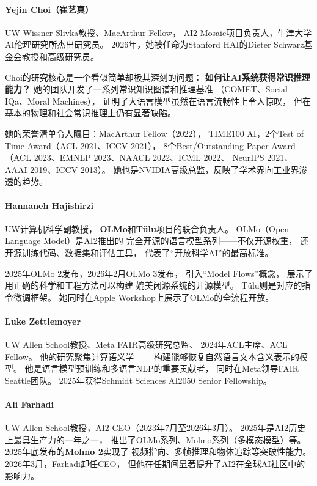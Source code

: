 \paragraph{Yejin Choi（崔艺真）}
UW Wissner-Slivka教授、MacArthur Fellow，
AI2 Mosaic项目负责人，牛津大学AI伦理研究所杰出研究员。
2026年，她被任命为Stanford HAI的Dieter Schwarz基金会教授和高级研究员。

Choi的研究核心是一个看似简单却极其深刻的问题：
\textbf{如何让AI系统获得常识推理能力？}
她的团队开发了一系列常识知识图谱和推理基准
（COMET、Social IQa、Moral Machines），
证明了大语言模型虽然在语言流畅性上令人惊叹，
但在基本的物理和社会常识推理上仍有显著缺陷。

她的荣誉清单令人瞩目：MacArthur Fellow（2022），
TIME100 AI，2个Test of Time Award（ACL 2021、ICCV 2021），
8个Best/Outstanding Paper Award
（ACL 2023、EMNLP 2023、NAACL 2022、ICML 2022、
NeurIPS 2021、AAAI 2019、ICCV 2013）。
她也是NVIDIA高级总监，反映了学术界向工业界渗透的趋势。

\paragraph{Hannaneh Hajishirzi}
UW计算机科学副教授，
\textbf{OLMo}和\textbf{T\"{u}lu}项目的联合负责人。
OLMo（Open Language Model）是AI2推出的
完全开源的语言模型系列——不仅开源权重，
还开源训练代码、数据集和评估工具，
代表了``开放科学AI''的最高标准。

2025年OLMo 2发布，2026年2月OLMo 3发布，
引入``Model Flows''概念，
展示了用正确的科学和工程方法可以构建
媲美闭源系统的开源模型。
T\"{u}lu则是对应的指令微调框架。
她同时在Apple Workshop上展示了OLMo的全流程开放。

\paragraph{Luke Zettlemoyer}
UW Allen School教授、Meta FAIR高级研究总监、
2024年ACL主席、ACL Fellow。
他的研究聚焦计算语义学——
构建能够恢复自然语言文本含义表示的模型。
他是语言模型预训练和多语言NLP的重要贡献者，
同时在Meta领导FAIR Seattle团队。
2025年获得Schmidt Sciences AI2050 Senior Fellowship。

\paragraph{Ali Farhadi}
UW Allen School教授，AI2 CEO（2023年7月至2026年3月）。
2025年是AI2历史上最具生产力的一年之一，
推出了OLMo系列、Molmo系列（多模态模型）等。
2025年底发布的\textbf{Molmo 2}实现了
视频指向、多帧推理和物体追踪等突破性能力。
2026年3月，Farhadi卸任CEO，
但他在任期间显著提升了AI2在全球AI社区中的影响力。

